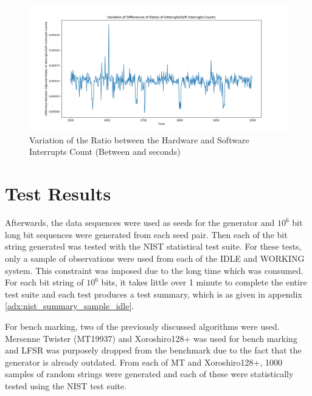 \begin{figure}[h!]
    \includegraphics[width=1.0\textwidth]{images/PLT_ADJ_INTERRUPTS_RATIOS_DIFFERENCES_IDLE_1500_500.png}
    \centering
    \caption{Variation of the Ratio between the Hardware and Software Interrupts Count (Between  and  seconds)}
    \label{fig:4_plt_int_sw_int_ratios}
\end{figure}

\section{Test Results}

Afterwards, the data sequences were used as seeds for the generator and $10^6$ bit long bit sequences were generated from each seed pair. Then each of the bit string generated was tested with the NIST statistical test suite. For these tests, only a sample of observations were used from each of the IDLE and WORKING system. This constraint was imposed due to the long time which was consumed. For each bit string of $10^6$ bits, it takes little over 1 minute to complete the entire test suite and each test produces a test summary, which is as given in appendix \ref{adx:nist_summary_sample_idle}.

For bench marking, two of the previously discussed algorithms were used. Mersenne Twister (MT19937) and Xoroshiro128+ was used for bench marking and LFSR was purposely dropped from the benchmark due to the fact that the generator is already outdated. From each of MT and Xoroshiro128+, 1000 samples of random strings were generated and each of these were statistically tested using the NIST test suite.

